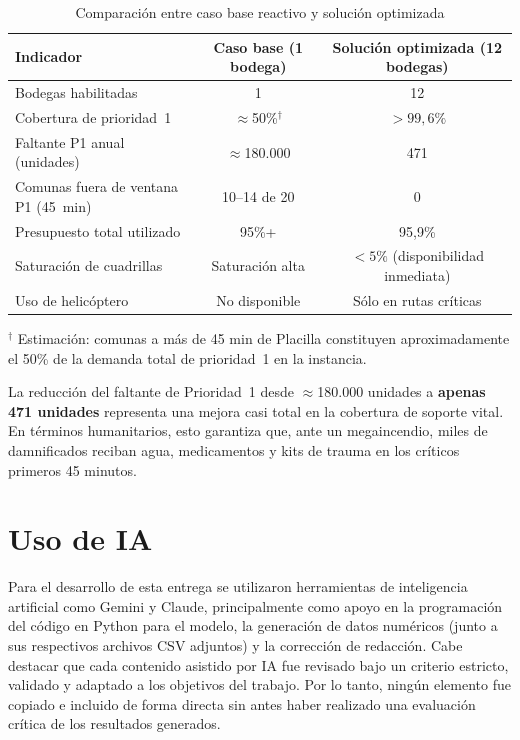 \documentclass[letterpaper]{article}
\begin{document}
\begin{flushleft}
\begin{table}[H]
\centering
\caption{Comparación entre caso base reactivo y solución optimizada}
\label{tab:comparacion_base}
\begin{tabular}{lcc}
\hline
\textbf{Indicador} & \textbf{Caso base (1 bodega)} & \textbf{Solución optimizada (12 bodegas)} \\
\hline
Bodegas habilitadas                     & 1            & 12 \\
Cobertura de prioridad~1                & $\approx$50\%$^\dagger$ & $>99{,}6\%$ \\
Faltante P1 anual (unidades)            & $\approx$180.000 & 471 \\
Comunas fuera de ventana P1 (45~min)    & 10--14 de 20 & 0 \\
Presupuesto total utilizado             & 95\%+        & 95{,}9\% \\
Saturación de cuadrillas                & Saturación alta & $<5\%$ (disponibilidad inmediata) \\
Uso de helicóptero                      & No disponible & Sólo en rutas críticas \\
\hline
\end{tabular}
\end{table}
{\small $^\dagger$ Estimación: comunas a más de 45 min de Placilla constituyen aproximadamente el 50\% de la demanda total de prioridad~1 en la instancia.}

La reducción del faltante de Prioridad~1 desde $\approx$180.000 unidades a \textbf{apenas 471 unidades} representa una mejora casi total en la cobertura de soporte vital. En términos humanitarios, esto garantiza que, ante un megaincendio, miles de damnificados reciban agua, medicamentos y kits de trauma en los críticos primeros 45 minutos.

\section{Uso de IA}

Para el desarrollo de esta entrega se utilizaron herramientas de inteligencia artificial como Gemini y Claude, principalmente como apoyo en la programación del código en Python para el modelo, la generación de datos numéricos (junto a sus respectivos archivos CSV adjuntos) y la corrección de redacción. Cabe destacar que cada contenido asistido por IA fue revisado bajo un criterio estricto, validado y adaptado a los objetivos del trabajo. Por lo tanto, ningún elemento fue copiado e incluido de forma directa sin antes haber realizado una evaluación crítica de los resultados generados.


\end{flushleft}
\end{document}
